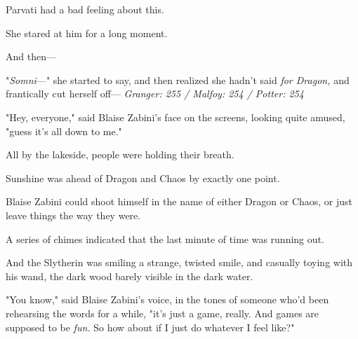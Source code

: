Parvati had a bad feeling about this.

She stared at him for a long moment.

And then---

"\emph{Somni}---" she started to say, and then realized she hadn't said \emph{for
Dragon,} and frantically cut herself off---
\sbreak
\emph{Granger: 255 / Malfoy: 254 / Potter: 254}

"Hey, everyone," said Blaise Zabini's face on the screens, looking quite
amused, "guess it's all down to me."

All by the lakeside, people were holding their breath.

Sunshine was ahead of Dragon and Chaos by exactly one point.

Blaise Zabini could shoot himself in the name of either Dragon or Chaos, or
just leave things the way they were.

A series of chimes indicated that the last minute of time was running out.

And the Slytherin was smiling a strange, twisted smile, and casually toying
with his wand, the dark wood barely visible in the dark water.

"You know," said Blaise Zabini's voice, in the tones of someone who'd been
rehearsing the words for a while, "it's just a game, really. And games are
supposed to be \emph{fun.} So how about if I just do whatever I feel like?"

